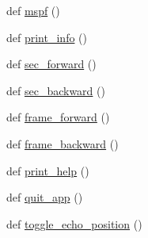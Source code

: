 \begin{DoxyCompactItemize}
def \hyperlink{namespacesrc_1_1lib_1_1vlc_acbd889ac34678556489c23672a983a93}{mspf} ()
\item 
def \hyperlink{namespacesrc_1_1lib_1_1vlc_ace3952b9abf5947d5c925f0e7130e06c}{print\+\_\+info} ()
\item 
def \hyperlink{namespacesrc_1_1lib_1_1vlc_a6397c11f9ade3ebc16e7a6ca9e51ade5}{sec\+\_\+forward} ()
\item 
def \hyperlink{namespacesrc_1_1lib_1_1vlc_aedc80c0ce1e4292a293fd968aa37ca7d}{sec\+\_\+backward} ()
\item 
def \hyperlink{namespacesrc_1_1lib_1_1vlc_a3e410b6ca2aa39f2afdbac05d8879d72}{frame\+\_\+forward} ()
\item 
def \hyperlink{namespacesrc_1_1lib_1_1vlc_ab43bb562d8cbba6249072c95a69060f6}{frame\+\_\+backward} ()
\item 
def \hyperlink{namespacesrc_1_1lib_1_1vlc_aa4b74826377e611e8d599b616b66f4c4}{print\+\_\+help} ()
\item 
def \hyperlink{namespacesrc_1_1lib_1_1vlc_a6fc41dd48eedf23e392ebf9fb2df8eba}{quit\+\_\+app} ()
\item 
def \hyperlink{namespacesrc_1_1lib_1_1vlc_a816fb960534df7a4109eb1922eaaa135}{toggle\+\_\+echo\+\_\+position} ()
\end{DoxyCompactItemize}
